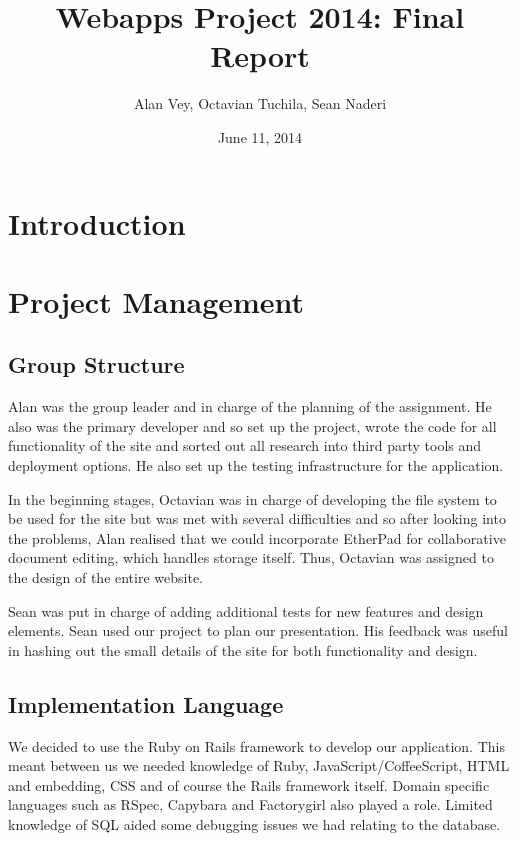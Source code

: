 \documentclass[a4wide, 11pt]{article}
\begin{document}
\title{Webapps Project 2014: Final Report}

\author{Alan Vey, Octavian Tuchila, Sean Naderi}

\date{June 11, 2014}         %

\maketitle            %
\clearpage

\section{Introduction}
\clearpage

\section{Project Management}
\subsection{Group Structure}
Alan was the group leader and in charge of the planning of the assignment. He also was the primary developer and so set up the project, wrote the code for all functionality of the site and sorted out all research into third party tools and deployment options. He also set up the testing infrastructure for the application.

In the beginning stages, Octavian was in charge of developing the file system to be used for the site but was met with several difficulties and so after looking into the problems, Alan realised that we could incorporate EtherPad for collaborative document editing, which handles storage itself. Thus, Octavian was assigned to the design of the entire website. 

Sean was put in charge of adding additional tests for new features and design elements. Sean used our project to plan our presentation. His feedback was useful in hashing out the small details of the site for both functionality and design.

\subsection{Implementation Language}
We decided to use the Ruby on Rails framework to develop our application. This meant between us we needed knowledge of Ruby, JavaScript/CoffeeScript, HTML and embedding, CSS and of course the Rails framework itself. Domain specific languages such as RSpec, Capybara and Factorygirl also played a role. Limited knowledge of SQL aided some debugging issues we had relating to the database.
\end{document}
